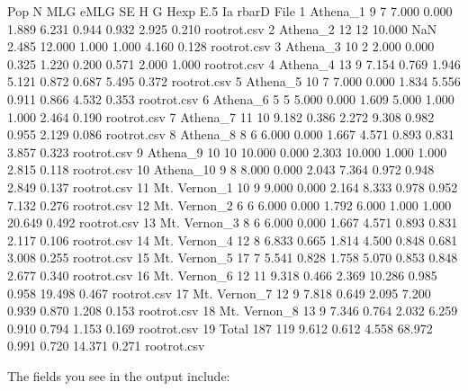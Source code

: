 \documentclass[letterpaper]{article}
\begin{document}
\begin{Schunk}
\begin{Soutput}
            Pop   N MLG   eMLG    SE     H      G  Hexp   E.5     Ia rbarD        File
1      Athena_1   9   7  7.000 0.000 1.889  6.231 0.944 0.932  2.925 0.210 rootrot.csv
2      Athena_2  12  12 10.000   NaN 2.485 12.000 1.000 1.000  4.160 0.128 rootrot.csv
3      Athena_3  10   2  2.000 0.000 0.325  1.220 0.200 0.571  2.000 1.000 rootrot.csv
4      Athena_4  13   9  7.154 0.769 1.946  5.121 0.872 0.687  5.495 0.372 rootrot.csv
5      Athena_5  10   7  7.000 0.000 1.834  5.556 0.911 0.866  4.532 0.353 rootrot.csv
6      Athena_6   5   5  5.000 0.000 1.609  5.000 1.000 1.000  2.464 0.190 rootrot.csv
7      Athena_7  11  10  9.182 0.386 2.272  9.308 0.982 0.955  2.129 0.086 rootrot.csv
8      Athena_8   8   6  6.000 0.000 1.667  4.571 0.893 0.831  3.857 0.323 rootrot.csv
9      Athena_9  10  10 10.000 0.000 2.303 10.000 1.000 1.000  2.815 0.118 rootrot.csv
10    Athena_10   9   8  8.000 0.000 2.043  7.364 0.972 0.948  2.849 0.137 rootrot.csv
11 Mt. Vernon_1  10   9  9.000 0.000 2.164  8.333 0.978 0.952  7.132 0.276 rootrot.csv
12 Mt. Vernon_2   6   6  6.000 0.000 1.792  6.000 1.000 1.000 20.649 0.492 rootrot.csv
13 Mt. Vernon_3   8   6  6.000 0.000 1.667  4.571 0.893 0.831  2.117 0.106 rootrot.csv
14 Mt. Vernon_4  12   8  6.833 0.665 1.814  4.500 0.848 0.681  3.008 0.255 rootrot.csv
15 Mt. Vernon_5  17   7  5.541 0.828 1.758  5.070 0.853 0.848  2.677 0.340 rootrot.csv
16 Mt. Vernon_6  12  11  9.318 0.466 2.369 10.286 0.985 0.958 19.498 0.467 rootrot.csv
17 Mt. Vernon_7  12   9  7.818 0.649 2.095  7.200 0.939 0.870  1.208 0.153 rootrot.csv
18 Mt. Vernon_8  13   9  7.346 0.764 2.032  6.259 0.910 0.794  1.153 0.169 rootrot.csv
19        Total 187 119  9.612 0.612 4.558 68.972 0.991 0.720 14.371 0.271 rootrot.csv
\end{Soutput}
\end{Schunk}
The fields you see in the output include:
\end{document}
